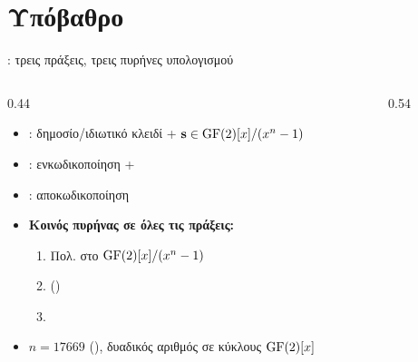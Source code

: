 \section{Υπόβαθρο}

\begin{frame}{\HQC \KEM: τρεις πράξεις, τρεις πυρήνες υπολογισμού}
  \begin{columns}[T]
    \begin{column}{0.44\textwidth}
      \begin{itemize}
        \item \KeyGen: δημοσίο/ιδιωτικό κλειδί +  $\mathbf{s} \in \mathrm{GF}(2)[x]/(x^{n}-1)$
        \item \Encaps: ενκωδικοποίηση  + \polymul
        \item \Decaps: αποκωδικοποίηση 
        \item \textbf{Κοινός πυρήνας σε όλες τις πράξεις:}
              \begin{enumerate}\small
                \item[$\polymul$] Πολ. στο $\mathrm{GF}(2)[x]/(x^{n}-1)$
                \item[$\oplus$]  ()
                \item[\ding{221}] 
              \end{enumerate}
        \item $n = \num{17669}$  (), δυαδικός αριθμός σε κύκλους $\mathrm{GF}(2)[x]$
      \end{itemize}
    \end{column}
    \begin{column}{0.54\textwidth}
      \centering
      \resizebox{!}{0.70\textheight}{%
      }
    \end{column}
  \end{columns}
\end{frame}

